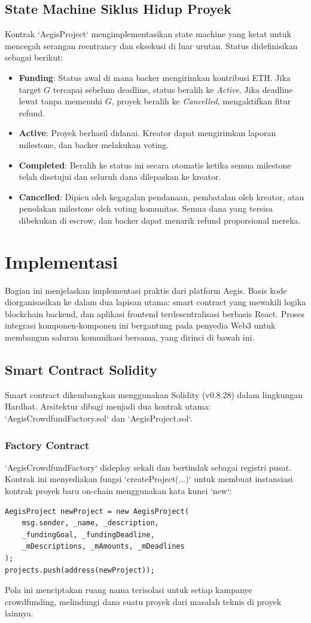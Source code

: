 \documentclass[conference]{IEEEtran}
\begin{document}
\subsection{State Machine Siklus Hidup Proyek}
Kontrak `AegisProject` mengimplementasikan state machine yang ketat untuk mencegah serangan reentrancy dan eksekusi di luar urutan. Status didefinisikan sebagai berikut:
\begin{itemize}
	\item \textbf{Funding}: Status awal di mana backer mengirimkan kontribusi ETH. Jika target $G$ tercapai sebelum deadline, status beralih ke \textit{Active}. Jika deadline lewat tanpa memenuhi $G$, proyek beralih ke \textit{Cancelled}, mengaktifkan fitur refund.
	\item \textbf{Active}: Proyek berhasil didanai. Kreator dapat mengirimkan laporan milestone, dan backer melakukan voting.
	\item \textbf{Completed}: Beralih ke status ini secara otomatis ketika semua milestone telah disetujui dan seluruh dana dilepaskan ke kreator.
	\item \textbf{Cancelled}: Dipicu oleh kegagalan pendanaan, pembatalan oleh kreator, atau penolakan milestone oleh voting komunitas. Semua dana yang tersisa dibekukan di escrow, dan backer dapat menarik refund proporsional mereka.
\end{itemize}

\section{Implementasi}
Bagian ini menjelaskan implementasi praktis dari platform Aegis. Basis kode diorganisasikan ke dalam dua lapisan utama: smart contract yang mewakili logika blockchain backend, dan aplikasi frontend terdesentralisasi berbasis React. Proses integrasi komponen-komponen ini bergantung pada penyedia Web3 untuk membangun saluran komunikasi bersama, yang dirinci di bawah ini.

\subsection{Smart Contract Solidity}
Smart contract dikembangkan menggunakan Solidity (v0.8.28) dalam lingkungan Hardhat. Arsitektur dibagi menjadi dua kontrak utama: `AegisCrowdfundFactory.sol` dan `AegisProject.sol`.

\subsubsection{Factory Contract}
`AegisCrowdfundFactory` dideploy sekali dan bertindak sebagai registri pusat. Kontrak ini menyediakan fungsi `createProject(...)` untuk membuat instansiasi kontrak proyek baru on-chain menggunakan kata kunci `new`:
\begin{verbatim}
AegisProject newProject = new AegisProject(
    msg.sender, _name, _description,
    _fundingGoal, _fundingDeadline,
    _mDescriptions, _mAmounts, _mDeadlines
);
projects.push(address(newProject));
\end{verbatim}
Pola ini menciptakan ruang nama terisolasi untuk setiap kampanye crowdfunding, melindungi dana suatu proyek dari masalah teknis di proyek lainnya.
\end{document}
